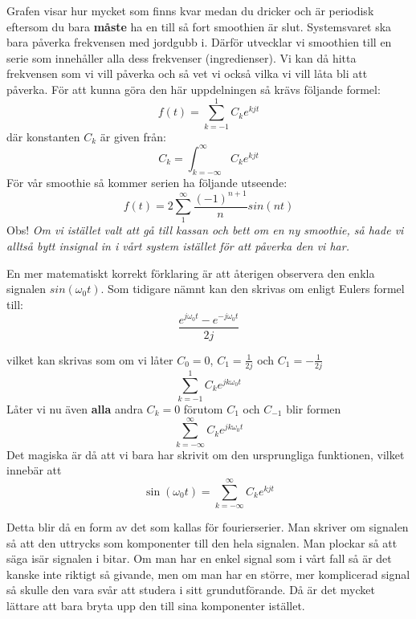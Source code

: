 \documentclass{article}
\begin{document}
Grafen visar hur mycket som finns kvar medan du dricker och är periodisk
eftersom du bara \textbf{måste} ha en till så fort smoothien är slut.
Systemsvaret ska bara påverka frekvensen med jordgubb i.
Därför utvecklar vi smoothien till en serie som innehåller alla dess
frekvenser (ingredienser). Vi kan då hitta frekvensen som vi vill påverka och
så vet vi också vilka vi vill låta bli att påverka.
För att kunna göra den här uppdelningen så krävs följande formel:
\begin{displaymath}
  f(t) = \sum_{k=-1}^1 C_k e^{k j t}
\end{displaymath}
där konstanten $C_k$ är given från:
\begin{displaymath}
  C_k = \int_{k=-\infty}^{\infty} C_k e^{k j t}
\end{displaymath}
För vår smoothie så kommer serien ha följande utseende:
\begin{displaymath}
  f(t) = 2 \sum_{1}^{\infty} \frac{(-1)^{n+1}}{n} sin(n t)
\end{displaymath}
Obs! \emph{Om vi istället valt att gå till kassan och bett om en ny smoothie,
  så hade vi alltså bytt insignal in i vårt system istället för att påverka den vi har.}

En mer matematiskt korrekt förklaring är att återigen observera den enkla
signalen $sin(\omega_0 t)$. Som tidigare nämnt kan den skrivas om enligt Eulers
formel till:
\begin{displaymath}
  \frac{e^{j \omega_0 t} - e^{-j \omega_0 t}}{2j}
\end{displaymath}

vilket kan skrivas som om vi låter $C_0=0$, $C_{1}=\frac{1}{2j}$ och
$C_{1}=-\frac{1}{2j}$
\begin{displaymath}
  \sum_{k=-1}^1 C_k e^{j k \omega_0 t}
\end{displaymath}
Låter vi nu även \textbf{alla} andra $C_k = 0$ förutom  $C_1$ och $C_{-1}$ blir formen
\begin{displaymath}
  \sum_{k=-\infty}^{\infty} C_k e^{j k \omega_0 t}
\end{displaymath}
Det magiska är då att vi bara har skrivit om den ursprungliga funktionen,
vilket innebär att
\begin{displaymath}
  \sin(\omega_0 t) = \sum_{k=-\infty}^{\infty} C_k e^{k j t}
\end{displaymath}

Detta blir då en form av det som kallas för fourierserier.
Man skriver om signalen så att den uttrycks som komponenter till den hela signalen.
Man plockar så att säga isär signalen i bitar. Om man har en enkel signal som i vårt fall så är det
kanske inte riktigt så givande, men om man har en större,
mer komplicerad signal så skulle den vara svår att studera i sitt
grundutförande. Då är det mycket lättare att bara bryta upp den
till sina komponenter istället.
\end{document}
